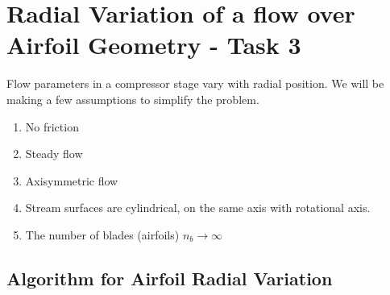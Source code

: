 \documentclass[titlepage]{article}
\begin{document}
\section{Radial Variation of a flow over Airfoil Geometry - Task 3}

Flow parameters in a compressor stage vary with radial position. We will be making
a few assumptions to simplify the problem.

\begin{enumerate}
    \item No friction 
    \item Steady flow 
    \item Axisymmetric flow
    \item Stream surfaces are cylindrical, on the same axis with rotational axis.
    \item The number of blades (airfoils) $n_{b} \rightarrow \infty$
\end{enumerate}

\subsection{Algorithm for Airfoil Radial Variation}
\end{document}
